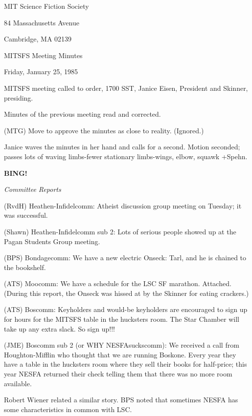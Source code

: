 \documentclass[12pt]{article}
\newcommand{\bing}{{\bf BING!} }
\newcommand{\goto}[1]{\bing \vskip 12pt \centerline{{\em{#1}}}}
\begin{document}
\begin{center}

MIT Science Fiction Society 

84 Massachusetts Avenue

Cambridge, MA 02139

\vspace{12pt}

MITSFS Meeting Minutes 

Friday, January 25, 1985

\end{center}
 
\vspace{18pt}

\setlength{\parskip}{6pt}

\noindent
MITSFS meeting called to order, 1700 SST,
Janice Eisen, President and Skinner, presiding.

Minutes of the previous meeting read and corrected.

(MTG) Move to approve the minutes as close to reality. (Ignored.)

Janice waves the minutes in her hand and calls for a second. Motion seconded; passes lots of waving limbs-fewer stationary limbs-wings, elbow, squawk +Spehn.

\goto{Committee Reports}

(RvdH) Heathen-Infidelcomm: Atheist discussion group meeting on Tuesday; it was successful.

(Shawn) Heathen-Infidelcomm sub 2: Lots of serious people showed up at the Pagan Students Group meeting.

(BPS) Bondagecomm: We have a new electric Onseck: Tarl, and he is chained to the bookshelf.

(ATS) Moocomm: We have a schedule for the LSC SF marathon. Attached. (During this report, the Onseck was hissed at by the Skinner for eating crackers.)

(ATS) Boscomm: Keyholders and would-be keyholders are encouraged to sign up for hours for the MITSFS table in the hucksters room. The Star Chamber will take up any extra slack. So sign up!!!

(JME) Boscomm sub 2 (or WHY NESFAsuckscomm): We received a call from Houghton-Mifflin who thought that we are running Boskone. Every year they have a table in the hucksters room where they sell their books for half-price; this year NESFA returned their check telling them that there was no more room available.

Robert Wiener related a similar story. BPS noted that sometimes NESFA has some characteristics in common with LSC.
\end{document}
